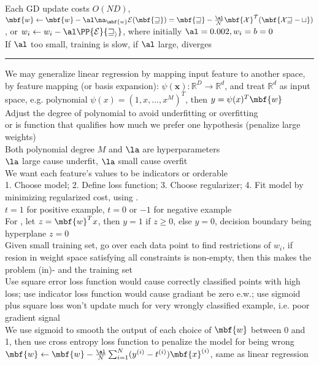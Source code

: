 \documentclass[10pt]{LatexTemplate/hw}
\begin{document}
\begin{multicols*}{5}
Each GD update costs $O(ND)$, $\mbf{w}\gets \mbf{w}-\al\na_{\mbf{w}}\cal{E}(\mbf{w})=\mbf{w}-\frac{\al}{N}\mbf{X}^T(\mbf{Xw-t})$, or $w_i\gets w_i-\al\PP{\cal{E}}{w_i}$, where initially $\al=0.002, w_i=b=0$ \\
If $\al$ too small, training is slow, if $\al$ large, diverges\\
\rule{\linewidth}{0.4pt}
We may generalize linear regression by mapping input feature to another space, by feature mapping (or basis expansion): $\psi(\mathbf{x}):\mathbb{R}^D\to\mathbb{R}^d$, and treat $\mathbb{R}^d$ as input space, e.g. polynomial $\psi(x)=(1, x, ..., x^M)^T$, then $y=\psi(x)^T\mbf{w}$\\
Adjust the degree of polynomial to avoid underfitting or overfitting\\
 or  is function that qualifies how much we prefer one hypothesis (penalize large weights)\\
Both polynomial degree $M$ and $\la$ are hyperparameters\\
$\la$ large cause underfit, $\la$ small cause overfit\\
We want each feature's values to be indicators or orderable\\
 1. Choose model; 2. Define loss function; 3. Choose regularizer; 4. Fit model by minimizing regularized cost, using .\\
$t=1$ for positive example, $t=0$ or $-1$ for negative example\\
For , let $z=\mbf{w}^Tx$, then $y=1$ if $z\ge0$, else $y=0$, decision boundary being hyperplane $z=0$\\
Given small training set, go over each data point to find restrictions of $w_i$, if resion in weight space satisfying all constraints is non-empty, then this  makes the problem (in)- and the training set \\
Use square error loss function would cause correctly classified points with high loss; use indicator loss function would cause gradiant be zero e.w.; use sigmoid plus square loss won't update much for very wrongly classified example, i.e. poor gradient signal\\
We use sigmoid to smooth the output of each choice of $\mbf{w}$ between 0 and 1, then use cross entropy loss function to penalize the model for being wrong\\
$\mbf{w}\gets \mbf{w}-\frac{\al}{N}\sum_{i=1}^N(y^{(i)}-t^{(i)})\mbf{x}^{(i)}$, same as linear regression\\

\end{multicols*}
\end{document}
